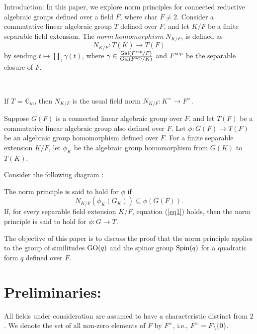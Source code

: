 \documentclass[sn-mathphys-num]{sn-jnl}%
\begin{document}
 
\begin{section}
{Introduction:}
In this paper, we explore norm principles for connected reductive algebraic groups defined over a field $F$, where char $F \neq 2$. Consider a commutative linear algebraic group $T$ defined over $F$, and let $K/F$ be a finite separable field extension. The $norm\ homomorphism\ N_{K/F}$, is defined as
\[
N_{K/F}: T(K) \to T(F)\]
by sending $t \mapsto \prod_{\gamma } \gamma(t)$, where $\gamma \in \frac{{\rm Gal}(F^{\rm sep}/F)}{{\rm Gal}(F^{\rm sep}/K)}$ and $F^{\rm sep}$ be the separable closure of $F$.


\

If $T$ = $\mathbb {G}_m$, then $N_{K/F}$ is the usual field norm $N_{K/F} : K^\times \to F^\times$.

Suppose $G(F)$ is a connected linear algebraic group over $F$, and let $T(F)$ be a commutative linear algebraic group also defined over $F$. Let $\phi : G(F) \to T(F) $ be an algebraic group homomorphism defined over $F$. For a finite separable extension $K/F$, let $\phi_K$ be the algebraic group homomorphism from $G(K)$ to $T(K)$. 

Consider the following diagram :\begin{center}
\end{center}
The norm principle is said to hold for $\phi$ if  
\begin{equation}\label{eq1} 
N_{K/F}(\phi_K (G_K)) \subseteq \phi(G(F)).
\end{equation} 
If, for every separable field extension $K/F$, equation (\ref{eq1}) holds, then the norm principle is said to hold for $\phi : G \to T$.

The objective of this paper is to discuss the proof that the norm principle applies to the group of similitudes ${\rm GO}(q)$ and the spinor group ${\rm Spin}(q)$ for a quadratic form $q$ defined over $F$.

\end{section}
\section{Preliminaries:} \label{prelim}
All fields under consideration are assumed to have a characteristic distinct from $2$. We denote the set of all non-zero elements of $F$ by $F^\times$, i.e., $F^\times=F \setminus \{0\}$.
\medskip
\end{document}
